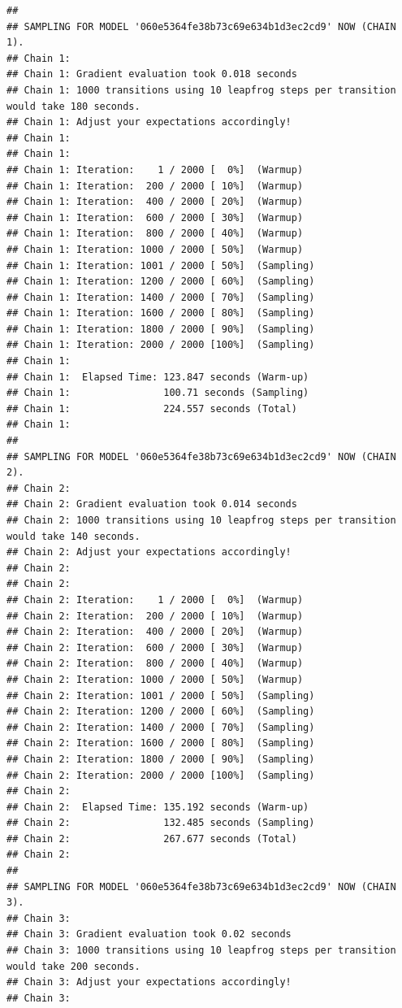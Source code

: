 \documentclass[]{article}
\begin{document}
\begin{verbatim}
## 
## SAMPLING FOR MODEL '060e5364fe38b73c69e634b1d3ec2cd9' NOW (CHAIN 1).
## Chain 1: 
## Chain 1: Gradient evaluation took 0.018 seconds
## Chain 1: 1000 transitions using 10 leapfrog steps per transition would take 180 seconds.
## Chain 1: Adjust your expectations accordingly!
## Chain 1: 
## Chain 1: 
## Chain 1: Iteration:    1 / 2000 [  0%]  (Warmup)
## Chain 1: Iteration:  200 / 2000 [ 10%]  (Warmup)
## Chain 1: Iteration:  400 / 2000 [ 20%]  (Warmup)
## Chain 1: Iteration:  600 / 2000 [ 30%]  (Warmup)
## Chain 1: Iteration:  800 / 2000 [ 40%]  (Warmup)
## Chain 1: Iteration: 1000 / 2000 [ 50%]  (Warmup)
## Chain 1: Iteration: 1001 / 2000 [ 50%]  (Sampling)
## Chain 1: Iteration: 1200 / 2000 [ 60%]  (Sampling)
## Chain 1: Iteration: 1400 / 2000 [ 70%]  (Sampling)
## Chain 1: Iteration: 1600 / 2000 [ 80%]  (Sampling)
## Chain 1: Iteration: 1800 / 2000 [ 90%]  (Sampling)
## Chain 1: Iteration: 2000 / 2000 [100%]  (Sampling)
## Chain 1: 
## Chain 1:  Elapsed Time: 123.847 seconds (Warm-up)
## Chain 1:                100.71 seconds (Sampling)
## Chain 1:                224.557 seconds (Total)
## Chain 1: 
## 
## SAMPLING FOR MODEL '060e5364fe38b73c69e634b1d3ec2cd9' NOW (CHAIN 2).
## Chain 2: 
## Chain 2: Gradient evaluation took 0.014 seconds
## Chain 2: 1000 transitions using 10 leapfrog steps per transition would take 140 seconds.
## Chain 2: Adjust your expectations accordingly!
## Chain 2: 
## Chain 2: 
## Chain 2: Iteration:    1 / 2000 [  0%]  (Warmup)
## Chain 2: Iteration:  200 / 2000 [ 10%]  (Warmup)
## Chain 2: Iteration:  400 / 2000 [ 20%]  (Warmup)
## Chain 2: Iteration:  600 / 2000 [ 30%]  (Warmup)
## Chain 2: Iteration:  800 / 2000 [ 40%]  (Warmup)
## Chain 2: Iteration: 1000 / 2000 [ 50%]  (Warmup)
## Chain 2: Iteration: 1001 / 2000 [ 50%]  (Sampling)
## Chain 2: Iteration: 1200 / 2000 [ 60%]  (Sampling)
## Chain 2: Iteration: 1400 / 2000 [ 70%]  (Sampling)
## Chain 2: Iteration: 1600 / 2000 [ 80%]  (Sampling)
## Chain 2: Iteration: 1800 / 2000 [ 90%]  (Sampling)
## Chain 2: Iteration: 2000 / 2000 [100%]  (Sampling)
## Chain 2: 
## Chain 2:  Elapsed Time: 135.192 seconds (Warm-up)
## Chain 2:                132.485 seconds (Sampling)
## Chain 2:                267.677 seconds (Total)
## Chain 2: 
## 
## SAMPLING FOR MODEL '060e5364fe38b73c69e634b1d3ec2cd9' NOW (CHAIN 3).
## Chain 3: 
## Chain 3: Gradient evaluation took 0.02 seconds
## Chain 3: 1000 transitions using 10 leapfrog steps per transition would take 200 seconds.
## Chain 3: Adjust your expectations accordingly!
## Chain 3: 

\end{verbatim}
\end{document}
